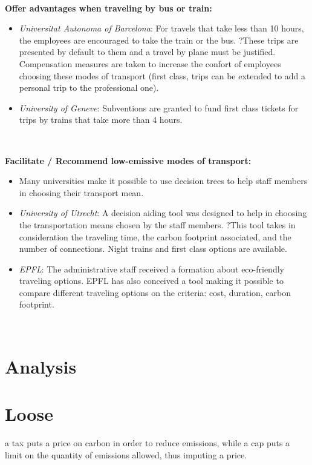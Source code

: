 \documentclass[version=3.21, pagesize, twoside=off, bibliography=totoc, DIV=calc, fontsize=12pt, a4paper]{scrartcl}
\begin{document}
\

\textbf{Offer advantages when traveling by bus or train:}

\begin{itemize}
\item \emph{Universitat Autonoma of Barcelona}: For travels that take less than 10 hours, the employees are encouraged to take the train or the bus. ?These trips are presented by default to them and a travel by plane must be justified. Compensation measures are taken to increase the confort of employees choosing these modes of transport (first class, trips can be extended to add a personal trip to the professional one).
\item \emph{University of Geneve}: Subventions are granted to fund first class tickets for trips by trains that take more than 4 hours. 
\end{itemize}

\

\textbf{Facilitate / Recommend low-emissive modes of transport:}
\begin{itemize}
\item Many universities make it possible to use decision trees to help staff members in choosing their transport mean. 
\item \emph{University of Utrecht}: A decision aiding tool was designed to help in choosing the transportation means chosen by the staff members. ?This tool takes in consideration the traveling time, the carbon footprint associated, and the number of  connections. Night trains and first class options are available. 
\item \emph{EPFL}: The administrative staff received a formation about eco-friendly traveling options. EPFL has also conceived a tool making it possible to compare different traveling options on the criteria: cost, duration, carbon footprint.
\end{itemize}

\


 
\section{Analysis}
\label{sec:analysis}

%

\appendix
\section{Loose}
a tax puts a price on carbon in order to reduce emissions, while a cap puts a limit on the quantity of emissions allowed, thus imputing a price.
\end{document}
